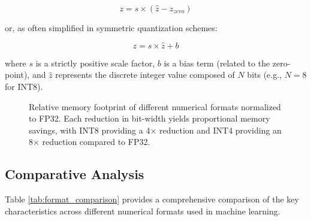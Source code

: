 \begin{equation}
  z = s \times (\hat{z} - z_{zero})
  \label{eq:int}
\end{equation}

\noindent or, as often simplified in symmetric quantization schemes:

\begin{equation}
  z = s \times \hat{z} + b
\end{equation}

\noindent where $s$ is a strictly positive scale factor, $b$ is a bias term (related to the zero-point), and $\hat{z}$ represents the discrete integer value composed of $N$ bits (e.g., $N=8$ for INT8).

\begin{figure}[H]
  \centering
  \caption{Relative memory footprint of different numerical formats normalized to FP32. Each reduction in bit-width yields proportional memory savings, with INT8 providing a 4× reduction and INT4 providing an 8× reduction compared to FP32.}
  \label{fig:memory_footprint}
\end{figure}

\subsection{Comparative Analysis}

Table \ref{tab:format_comparison} provides a comprehensive comparison of the key characteristics across different numerical formats used in machine learning.

